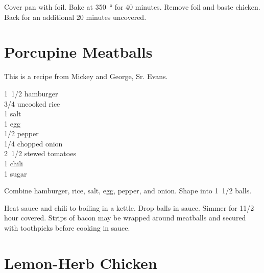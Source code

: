Cover pan with foil.  Bake at \SI{350}{\degree} for 40 minutes.  Remove foil and
baste chicken.  Back for an additional 20 minutes uncovered.

\section{Porcupine Meatballs}

\begin{open}
  This is a recipe from Mickey and George, Sr. Evans.
\end{open}
\begin{ingredients}
  \SI{1/2}[1]{\pound} hamburger \\
  \SI{3/4}{\cup} uncooked rice \\
  \SI{1}{\teaspoon} salt \\
  1 egg \\
  \SI{1/2}{\teaspoon} pepper \\
  \SI{1/4}{\cup} chopped onion \\
  \SI{1/2}[2]{\cup} stewed tomatoes \\
  \SI{1}{\teaspoon} chili \\
  \SI{1}{\teaspoon} sugar
\end{ingredients}
Combine hamburger, rice, salt, egg, pepper, and onion.  Shape into
\SI{1/2}[1]{\inch} balls.

Heat sauce and chili to boiling in a kettle.  Drop balls in sauce.  Simmer for
1\num{1/2} hour covered.  Strips of bacon may be wrapped around meatballs
and secured with toothpicks before cooking in sauce.

\section{Lemon-Herb Chicken
}


